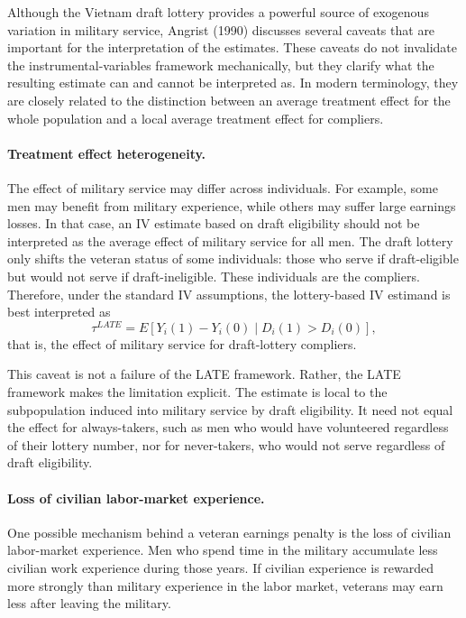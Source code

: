 \documentclass[11pt,a4paper]{article}
\begin{document}
Although the Vietnam draft lottery provides a powerful source of exogenous variation in
military service, Angrist (1990) discusses several caveats that are important for the
interpretation of the estimates. These caveats do not invalidate the instrumental-variables
framework mechanically, but they clarify what the resulting estimate can and cannot be
interpreted as. In modern terminology, they are closely related to the distinction between
an average treatment effect for the whole population and a local average treatment effect
for compliers.

\paragraph{Treatment effect heterogeneity.}
The effect of military service may differ across individuals. For example, some men may
benefit from military experience, while others may suffer large earnings losses. In that
case, an IV estimate based on draft eligibility should not be interpreted as the average
effect of military service for all men. The draft lottery only shifts the veteran status of
some individuals: those who serve if draft-eligible but would not serve if draft-ineligible.
These individuals are the compliers. Therefore, under the standard IV assumptions, the
lottery-based IV estimand is best interpreted as
\[
    \tau^{LATE}
    =
    E\!\left[Y_i(1)-Y_i(0)\mid D_i(1)>D_i(0)\right],
\]
that is, the effect of military service for draft-lottery compliers.

This caveat is not a failure of the LATE framework. Rather, the LATE framework makes
the limitation explicit. The estimate is local to the subpopulation induced into military
service by draft eligibility. It need not equal the effect for always-takers, such as men who
would have volunteered regardless of their lottery number, nor for never-takers, who would
not serve regardless of draft eligibility.

\paragraph{Loss of civilian labor-market experience.}
One possible mechanism behind a veteran earnings penalty is the loss of civilian labor-market
experience. Men who spend time in the military accumulate less civilian work experience
during those years. If civilian experience is rewarded more strongly than military experience
in the labor market, veterans may earn less after leaving the military.
\end{document}
